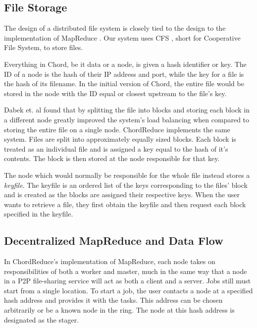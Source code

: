 \documentclass[10pt, conference, compsocconf]{IEEEtran}
\begin{document}
\subsection{File Storage}
The design of a distributed file system is closely tied to the design to the implementation of MapReduce \cite{gfs} \cite{hdfs}.  Our system uses CFS \cite{CFS}, short for Cooperative File System, to store files.  

Everything in Chord, be it data or a node, is given a hash identifier or key. The ID of a node is the hash of their IP address and port, while the key for a file is the hash of its filename.  In the initial version of Chord, the entire file would be stored in the node with the ID equal or closest upstream to the file's key.

Dabek et. al found that by splitting the file into blocks and storing each block in a different node greatly improved the system's load balancing when compared to storing the entire file on a single node\cite{CFS}. ChordReduce implements the same system.  Files are split into approximately equally sized blocks.  Each block is treated as an individual file and is assigned a key equal to the hash of it's contents.  The block is then stored at the node responsible for that key.  

The node which would normally be responsible for the whole file instead stores a \textit{keyfile}.  The keyfile is an ordered list of the keys corresponding to the files' block and is created as the blocks are assigned their respective keys.  When the user wants to retrieve a file, they first obtain the keyfile and then request each block specified in the keyfile.



\subsection{Decentralized MapReduce and Data Flow} 
In ChordReduce's implementation of MapReduce, each node takes on responsibilities of both a worker and master, much in the same way that a node in a P2P file-sharing service will act as both a client and a server.  Jobs still must start from a single location.  To start a job, the user contacts a node at a specified hash address and provides it with the tasks.  This address can be chosen arbitrarily or be a known node in the ring. The node at this hash address is designated as the stager.  
\end{document}
